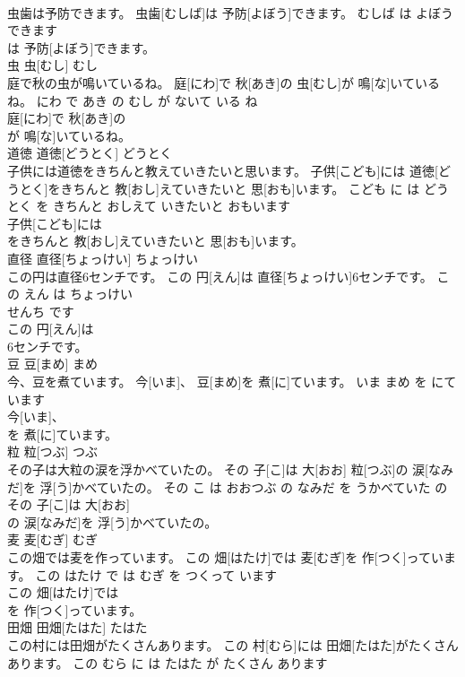 \documentclass[8pt]{extreport}
\begin{document}
\begin{CJK}{UTF8}{min}
\\	虫歯は予防できます。	虫歯[むしば]は 予防[よぼう]できます。	むしば は よぼう できます	
\\	は 予防[よぼう]できます。			
\\	虫	虫[むし]	むし	
\\	庭で秋の虫が鳴いているね。	庭[にわ]で 秋[あき]の 虫[むし]が 鳴[な]いているね。	にわ で あき の むし が ないて いる ね	
\\	庭[にわ]で 秋[あき]の
\\	が 鳴[な]いているね。			
\\	道徳	道徳[どうとく]	どうとく	
\\	子供には道徳をきちんと教えていきたいと思います。	子供[こども]には 道徳[どうとく]をきちんと 教[おし]えていきたいと 思[おも]います。	こども に は どうとく を きちんと おしえて いきたいと おもいます	
\\	子供[こども]には
\\	をきちんと 教[おし]えていきたいと 思[おも]います。			
\\	直径	直径[ちょっけい]	ちょっけい	
\\	この円は直径6センチです。	この 円[えん]は 直径[ちょっけい]6センチです。	この えん は ちょっけい 
\\	せんち です	
\\	この 円[えん]は
\\	6センチです。			
\\	豆	豆[まめ]	まめ	
\\	今、豆を煮ています。	今[いま]、 豆[まめ]を 煮[に]ています。	いま まめ を にて います	
\\	今[いま]、
\\	を 煮[に]ています。			
\\	粒	粒[つぶ]	つぶ	
\\	その子は大粒の涙を浮かべていたの。	その 子[こ]は 大[おお] 粒[つぶ]の 涙[なみだ]を 浮[う]かべていたの。	その こ は おおつぶ の なみだ を うかべていた の	
\\	その 子[こ]は 大[おお]
\\	の 涙[なみだ]を 浮[う]かべていたの。			
\\	麦	麦[むぎ]	むぎ	
\\	この畑では麦を作っています。	この 畑[はたけ]では 麦[むぎ]を 作[つく]っています。	この はたけ で は むぎ を つくって います	
\\	この 畑[はたけ]では
\\	を 作[つく]っています。			
\\	田畑	田畑[たはた]	たはた	
\\	この村には田畑がたくさんあります。	この 村[むら]には 田畑[たはた]がたくさんあります。	この むら に は たはた が たくさん あります	

\end{CJK}
\end{document}
